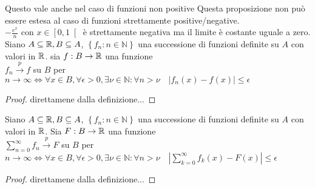 \observation
Questo vale anche nel caso di funzioni non positive
\observation
Questa proposizione non può essere estesa al caso di funzioni strettamente positive/negative.\\
\example $	-\frac{e^x}{n}$ con $x\in\left[0,1\right[$ è strettamente negativa ma il limite è costante uguale a zero.
\proposition
Siano $A\subseteq \mathbb{R}, B\subseteq A$, $\left\{f_n:n\in\mathbb{N}\right\}$ una successione di funzioni definite su $A$ con valori in $ \mathbb{R}$. sia $f:B\to \mathbb{R}$ una funzione\\
$f_n\overset{p}{\to}f$ su $B$ per $n\to\infty \Leftrightarrow \forall x\in B,\forall \epsilon >0,\exists\nu\in\mathbb{N}:\forall n>\nu \quad \left|f_n(x)-f(x)\right|\le \epsilon$
\begin{proof}
	direttamene dalla definizione...
\end{proof}
\proposition
Siano $A\subseteq \mathbb{R}, B\subseteq A$, $\left\{f_n:n\in\mathbb{N}\right\}$ una successione di funzioni definite su $A$ con valori in $ \mathbb{R}$. Sia $F:B\to \mathbb{R}$ una funzione\\
$\sum\limits_{n=0}^{\infty}f_n\overset{p}{\to}F$ su $B$ per $n\to\infty \Leftrightarrow \forall x\in B,\forall \epsilon >0,\exists\nu\in\mathbb{N}:\forall n>\nu \quad \left|\sum\limits_{k=0}^{\infty}f_k(x)-F(x)\right|\le \epsilon$
\begin{proof}
	direttamene dalla definizione...
\end{proof}

